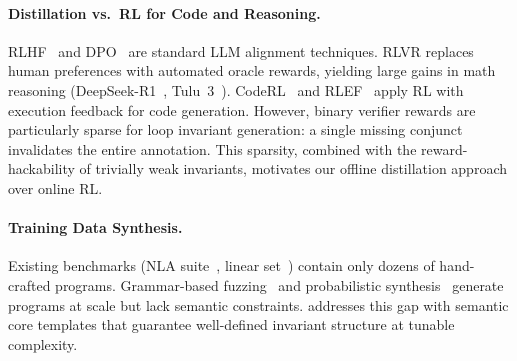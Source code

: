 \paragraph{Distillation vs.\ RL for Code and Reasoning.}
RLHF~\citep{ouyang2022training} and DPO~\citep{rafailov2023direct}
are standard LLM alignment techniques.
RLVR replaces human preferences with automated oracle rewards,
yielding large gains in math reasoning
(DeepSeek-R1~\citep{deepseekr1}, Tulu~3~\citep{lambert2024tulu}).
CodeRL~\citep{le2022coderl} and RLEF~\citep{gehring2024rlef}
apply RL with execution feedback for code generation.
However, binary verifier rewards are particularly sparse for
loop invariant generation: a single missing conjunct invalidates
the entire annotation.
This sparsity, combined with the reward-hackability of trivially
weak invariants, motivates our offline distillation approach over
online RL.

\paragraph{Training Data Synthesis.}
Existing benchmarks (NLA suite~\citep{svcomp},
linear set~\citep{si2018learning}) contain only dozens of hand-crafted
programs.
Grammar-based fuzzing~\citep{godefroid2008grammar} and probabilistic
synthesis~\citep{nori2015efficient} generate programs at scale but
lack semantic constraints.
\lf{} addresses this gap with semantic core templates
that guarantee well-defined invariant structure at tunable complexity.

